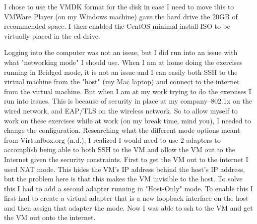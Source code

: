 \documentclass[10pt]{article}
\begin{document}
\par
I chose to use the VMDK format for the disk in case I need to move this to VMWare Player (on my Windows machine) gave the hard drive the 20GB of recommended space. I then enabled the CentOS minimal install ISO to be virtually placed in the cd drive.  
\par
{}%
\hfill
{}%
\par
Logging into the computer was not an issue, but I did run into an issue with what "networking mode" I should use. When I am at home doing the exercises running in Bridged mode, it is not an issue and I can easily both SSH to the virtual machine from the "host" (my Mac laptop) and connect to the internet from the virtual machine. But when I am at my work trying to do the exercises I run into issues. This is because of security in place at my company--802.1x on the wired network, and EAP/TLS on the wireless network. So to allow myself to work on these exercises while at work (on my break time, mind you), I needed to change the configuration. Researching what the different mode options meant from Virtualbox.org (n.d.), I realized I would need to use 2 adapters to accomplish being able to both SSH to the VM and allow the VM out to the Internet given the security constraints. First to get the VM out to the internet I used NAT mode. This hides the VM's IP address behind the host's IP address, but the problem here is that this makes the VM invisible to the host. To solve this I had to add a second adapter running in "Host-Only" mode. To enable this I first had to create a virtual adapter that is a new loopback interface on the host and then assign that adapter the mode. Now I was able to ssh to the VM and get the VM out onto the internet.
\end{document}
